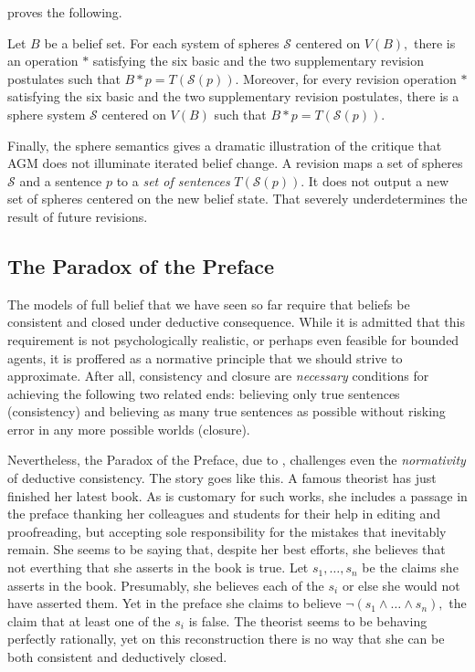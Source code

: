 \citet{grove1988two} proves the following.
\begin{theorem}
Let $B$ be a belief set. For each system of spheres $\mathcal{S}$ centered on
$V(B),$ there is an operation $*$ satisfying the six basic and the two
supplementary revision postulates such that $B*p = T(\mathcal{S}(p)).$ Moreover,
for every revision operation $*$ satisfying the six basic and the two
supplementary revision postulates, there is a sphere system $\mathcal{S}$
centered on $V(B)$ such that $B*p=T(\mathcal{S}(p)).$ 
\end{theorem}
Finally, the sphere semantics gives a dramatic illustration of the critique that
AGM does not illuminate iterated belief change. A revision maps a set of spheres
$\mathcal{S}$ and a sentence $p$ to a {\em set of sentences}
$T(\mathcal{S}(p)).$ It does not output a new set of spheres centered on the new
belief state. That severely underdetermines the result of future revisions.   

\subsection{The Paradox of the Preface}

The models of full belief that we have seen so far require that beliefs be
consistent and closed under deductive consequence. While it is admitted that
this requirement is not psychologically realistic, or perhaps even feasible for
bounded agents, it is proffered as a normative principle that we should strive
to approximate. After all, consistency and closure are {\em necessary}
conditions for achieving the following two related ends: believing only true
sentences (consistency) and believing as many true sentences as possible without
risking error in any more possible worlds (closure). 

Nevertheless, the Paradox of the Preface,  due to \citet{makinson1965preface},
challenges even the {\em normativity} of deductive consistency. The story goes
like this. A famous theorist has just finished her latest book. As is customary
for such works, she includes a passage in the preface thanking her colleagues
and students for their help in editing and proofreading, but accepting sole
responsibility for the mistakes that inevitably remain. She seems to be saying
that, despite her best efforts, she believes that not everthing that she asserts
in the book is true. Let $s_1, \ldots, s_n$ be the claims she asserts in the
book. Presumably, she believes each of the $s_i$ or else she would not have
asserted them. Yet in the preface she claims to believe
$\neg(s_1\wedge\ldots\wedge s_n),$ the claim that at least one of the $s_i$ is
false. The theorist seems to be behaving perfectly rationally, yet on this
reconstruction there is no way that she can be both consistent and deductively
closed.

